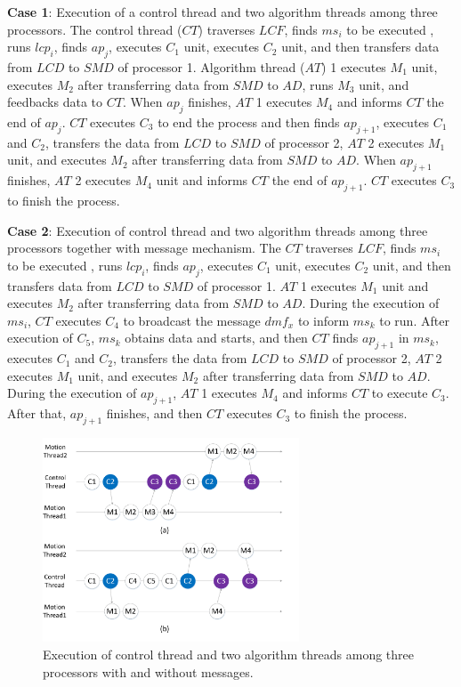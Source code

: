 \documentclass[journal,UTF8]{IEEEtran}
\begin{document}
\textbf{Case 1}: Execution of a control thread and two algorithm threads among three processors. The control thread ($CT$) traverses $LCF$, finds $ms_i$ to be executed , runs $lcp_i$, finds $ap_j$, executes $C_1$ unit, executes $C_2$ unit, and then transfers data from $LCD$ to $SMD$ of processor 1. Algorithm thread ($AT$) 1 executes $M_1$ unit, executes $M_2$ after transferring data from $SMD$ to $AD$, runs $M_3$ unit, and feedbacks data to $CT$. When $ap_j$ finishes, $AT$ 1 executes $M_4$ and informs $CT$ the end of $ap_j$. $CT$ executes $C_3$ to end the process and then finds $ap_{j+1}$, executes $C_1$ and $C_2$, transfers the data from $LCD$ to $SMD$ of processor 2, $AT$ 2 executes $M_1$ unit, and executes $M_2$ after transferring data from $SMD$ to $AD$. When $ap_{j+1}$ finishes, $AT$ 2 executes $M_4$ unit and informs $CT$ the end of $ap_{j+1}$. $CT$ executes $C_3$ to finish the process.
  
\textbf{Case 2}: Execution of control thread and two algorithm threads among three processors together with message mechanism. The $CT$ traverses $LCF$, finds $ms_i$ to be executed , runs $lcp_i$, finds $ap_j$, executes $C_1$ unit, executes $C_2$ unit, and then transfers data from $LCD$ to $SMD$ of processor 1. $AT$ 1 executes $M_1$ unit and executes $M_2$ after transferring data from $SMD$ to $AD$. During the execution of $ms_i$, $CT$ executes $C_4$ to broadcast the message $dmf_x$ to inform $ms_{k}$ to run. After execution of $C_5$, $ms_{k}$ obtains data and starts, and then $CT$ finds $ap_{j+1}$ in $ms_{k}$, executes $C_1$ and $C_2$, transfers the data from $LCD$ to $SMD$ of processor 2, $AT$ 2 executes $M_1$ unit, and executes $M_2$ after transferring data from $SMD$ to $AD$. During the execution of $ap_{j+1}$, $AT$ 1 executes $M_4$ and informs $CT$ to execute $C_3$. After that, $ap_{j+1}$ finishes, and then $CT$ executes $C_3$ to finish the process.
  

  
  \begin{figure}
  	\centering
  	\includegraphics[width=3in]{fig/threadFlow.pdf}
  	\caption{ Execution of control thread and two algorithm threads among three processors with and without messages.}
  	\label{fig:threadFlow}
  \end{figure}
\end{document}
